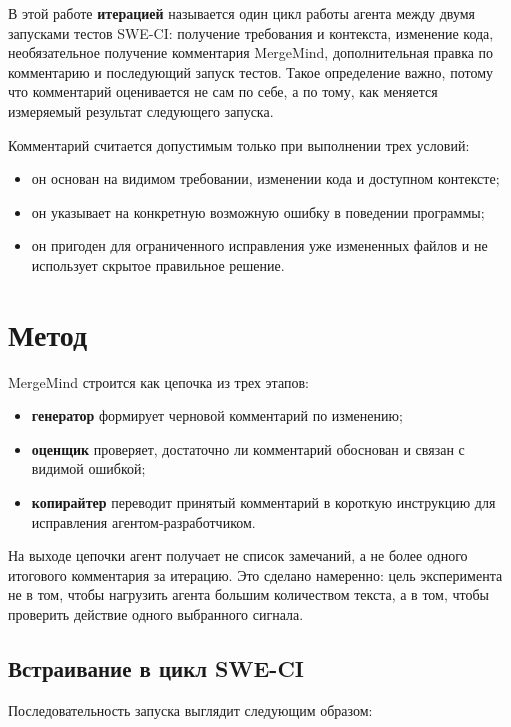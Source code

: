 \documentclass[12pt,a4paper]{article}
\begin{document}
В этой работе \textbf{итерацией} называется один цикл работы агента между двумя
запусками тестов SWE-CI: получение требования и контекста, изменение кода,
необязательное получение комментария MergeMind, дополнительная правка по
комментарию и последующий запуск тестов. Такое определение важно, потому что
комментарий оценивается не сам по себе, а по тому, как меняется измеряемый
результат следующего запуска.

Комментарий считается допустимым только при выполнении трех условий:

\begin{itemize}
  \item он основан на видимом требовании, изменении кода и доступном контексте;
  \item он указывает на конкретную возможную ошибку в поведении программы;
  \item он пригоден для ограниченного исправления уже измененных файлов и не
  использует скрытое правильное решение.
\end{itemize}

\section{Метод}

MergeMind строится как цепочка из трех этапов:

\begin{itemize}
  \item \textbf{генератор} формирует черновой комментарий по изменению;
  \item \textbf{оценщик} проверяет, достаточно ли комментарий обоснован и
  связан с видимой ошибкой;
  \item \textbf{копирайтер} переводит принятый комментарий в короткую
  инструкцию для исправления агентом-разработчиком.
\end{itemize}

На выходе цепочки агент получает не список замечаний, а не более одного
итогового комментария за итерацию. Это сделано намеренно: цель эксперимента не
в том, чтобы нагрузить агента большим количеством текста, а в том, чтобы
проверить действие одного выбранного сигнала.

\subsection{Встраивание в цикл SWE-CI}

Последовательность запуска выглядит следующим образом:
\end{document}
